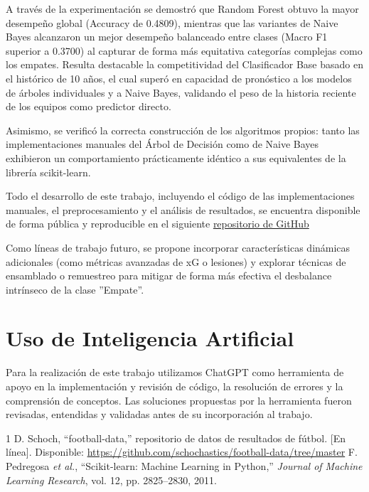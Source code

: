 \documentclass[conference]{IEEEtran}
\begin{document}
A través de la experimentación se demostró que Random Forest obtuvo la mayor desempeño global (Accuracy de 0.4809), mientras que las variantes de Naive Bayes alcanzaron un mejor desempeño balanceado entre clases (Macro F1 superior a 0.3700) al capturar de forma más equitativa categorías complejas como los empates. Resulta destacable la competitividad del Clasificador Base basado en el histórico de 10 años, el cual superó en capacidad de pronóstico a los modelos de árboles individuales y a Naive Bayes, validando el peso de la historia reciente de los equipos como predictor  directo.

Asimismo, se verificó la correcta construcción de los algoritmos propios: tanto las implementaciones manuales del Árbol de Decisión como de Naive Bayes exhibieron un comportamiento prácticamente idéntico a sus equivalentes de la librería scikit-learn. 

Todo el desarrollo de este trabajo, incluyendo el código de las implementaciones manuales, el preprocesamiento y el análisis de resultados, se encuentra disponible de forma pública y reproducible en el siguiente \href{https://github.com/lcoudet/Laboratorio_1_aprendaut}{repositorio de GitHub}

Como líneas de trabajo futuro, se propone incorporar características dinámicas adicionales (como métricas avanzadas de xG o lesiones) y explorar técnicas de ensamblado o remuestreo para mitigar de forma más efectiva el desbalance intrínseco de la clase ''Empate''.

\section{Uso de Inteligencia Artificial}

Para la realización de este trabajo utilizamos ChatGPT como herramienta de apoyo en la implementación y revisión de código, la resolución de errores y la comprensión de conceptos. Las soluciones propuestas por la herramienta fueron revisadas, entendidas y validadas antes de su incorporación al trabajo.



\begin{thebibliography}{1}
D. Schoch, ``football-data,'' repositorio de datos de resultados de fútbol.
[En línea]. Disponible: \url{https://github.com/schochastics/football-data/tree/master}
F. Pedregosa \emph{et al.}, ``Scikit-learn: Machine Learning in Python,''
\emph{Journal of Machine Learning Research}, vol. 12, pp. 2825--2830, 2011.
\end{thebibliography}
\end{document}
